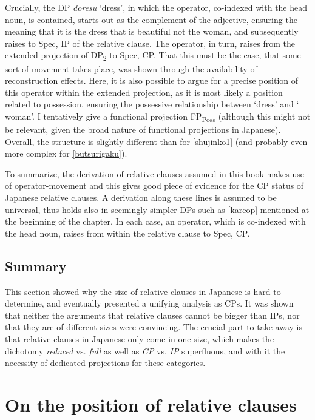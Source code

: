 \documentclass [output=book,colorlinks,citecolor=brown]{langscibook}
\begin{document}
Crucially, the DP \textit{doresu} `dress’, in which the operator, co-indexed with the head noun, is contained, starts out as the complement of the adjective, ensuring the meaning that it is the dress that is beautiful not the woman, and subsequently raises to Spec, IP of the relative clause. The operator, in turn, raises from the extended projection of DP\textsubscript{2} to Spec, CP. That this must be the case, that some sort of movement takes place, was shown through the availability of reconstruction effects. Here, it is also possible to argue for a precise position of this operator within the extended projection, as it is most likely a position related to possession, ensuring the possessive relationship between `dress’ and ` woman’. I tentatively give a functional projection FP\textsubscript{Poss} (although this might not be relevant, given the broad nature of functional projections in Japanese). Overall, the structure is slightly different than for \ref{shujinko1} (and probably even more complex for \ref{butsurigaku}). %

To summarize, the derivation of relative clauses assumed in this book makes use of operator-movement and this gives good piece of evidence for the CP status of Japanese relative clauses. A derivation along these lines is assumed to be universal, thus holds also in seemingly simpler DPs such as \ref{kareop} mentioned at the beginning of the chapter. In each case, an operator, which is co-indexed with the head noun, raises from within the relative clause to Spec, CP.

\subsection{Summary}

This section showed why the size of relative clauses in Japanese is hard to determine, and eventually presented a unifying analysis as CPs. It was shown that neither the arguments that relative clauses cannot be bigger than IPs, nor that they are of different sizes were convincing. The crucial part to take away is that relative clauses in Japanese only come in one size, which makes the dichotomy \textit{reduced} vs. \textit{full} as well as \textit{CP} vs. \textit{IP} superfluous, and with it the necessity of dedicated projections for these categories.

\section{On the position of relative clauses} \label{complexity}
\end{document}
